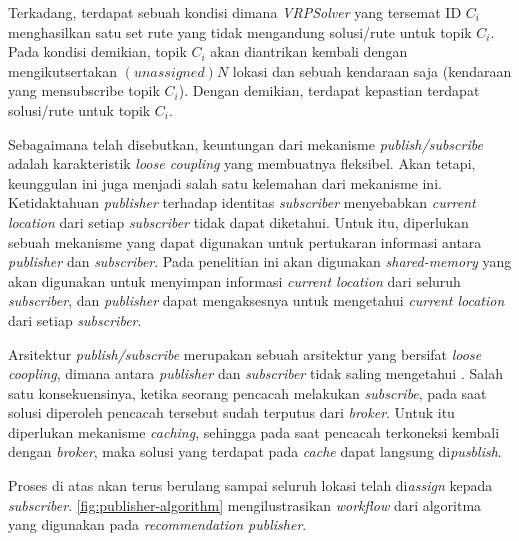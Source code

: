 Terkadang, terdapat sebuah kondisi dimana \textit{VRPSolver} yang tersemat ID $C_i$ menghasilkan satu set rute yang tidak mengandung solusi/rute untuk topik $C_i$. Pada kondisi demikian, topik $C_i$ akan diantrikan kembali dengan mengikutsertakan $(unassigned) N$ lokasi dan sebuah kendaraan saja (kendaraan yang mensubscribe topik $C_i$). Dengan demikian, terdapat kepastian terdapat solusi/rute untuk topik $C_i$.


Sebagaimana telah disebutkan, keuntungan dari mekanisme \textit{publish/subscribe} adalah karakteristik \textit{loose coupling} yang membuatnya fleksibel. Akan tetapi, keunggulan ini juga menjadi salah satu kelemahan dari mekanisme ini. Ketidaktahuan \textit{publisher} terhadap identitas \textit{subscriber} menyebabkan \textit{current location} dari setiap \textit{subscriber} tidak dapat diketahui. Untuk itu, diperlukan sebuah mekanisme yang dapat digunakan untuk pertukaran informasi antara \textit{publisher} dan \textit{subscriber}. Pada penelitian ini akan digunakan \textit{shared-memory} yang akan digunakan untuk menyimpan informasi \textit{current location} dari seluruh \textit{subscriber}, dan \textit{publisher} dapat mengaksesnya untuk mengetahui \textit{current location} dari setiap \textit{subscriber}.


Arsitektur \textit{publish/subscribe} merupakan sebuah arsitektur yang bersifat \textit{loose coopling}, dimana antara \textit{publisher} dan \textit{subscriber} tidak saling mengetahui \citep{muhl_large-scale_2002}. Salah satu konsekuensinya, ketika seorang pencacah melakukan \textit{subscribe}, pada saat solusi diperoleh pencacah tersebut sudah terputus dari \textit{broker}. Untuk itu diperlukan mekanisme \textit{caching}, sehingga pada saat pencacah terkoneksi kembali dengan \textit{broker}, maka solusi yang terdapat pada \textit{cache} dapat langsung di\textit{pusblish}.


Proses di atas akan terus berulang sampai seluruh lokasi telah di\textit{assign} kepada \textit{subscriber}. \autoref{fig:publisher-algorithm} mengilustrasikan \textit{workflow} dari algoritma yang digunakan pada \textit{recommendation publisher}.


